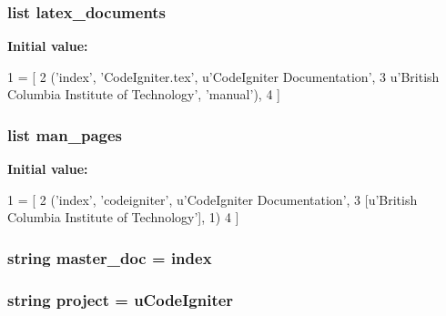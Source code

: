 \subsubsection[{latex\+\_\+documents}]{\setlength{\rightskip}{0pt plus 5cm}list latex\+\_\+documents}\label{namespaceconf_a19ce49f2838fb86624dc2d34e023baca}
{\bfseries Initial value\+:}
\begin{DoxyCode}
1 = [
2   (\textcolor{stringliteral}{'index'}, \textcolor{stringliteral}{'CodeIgniter.tex'}, \textcolor{stringliteral}{u'CodeIgniter Documentation'},
3    \textcolor{stringliteral}{u'British Columbia Institute of Technology'}, \textcolor{stringliteral}{'manual'}),
4 ]
\end{DoxyCode}
\hypertarget{namespaceconf_a09bebc3ead6c7c1acf6823c7a5609155}{}
\subsubsection[{man\+\_\+pages}]{\setlength{\rightskip}{0pt plus 5cm}list man\+\_\+pages}\label{namespaceconf_a09bebc3ead6c7c1acf6823c7a5609155}
{\bfseries Initial value\+:}
\begin{DoxyCode}
1 = [
2     (\textcolor{stringliteral}{'index'}, \textcolor{stringliteral}{'codeigniter'}, \textcolor{stringliteral}{u'CodeIgniter Documentation'},
3      [\textcolor{stringliteral}{u'British Columbia Institute of Technology'}], 1)
4 ]
\end{DoxyCode}
\hypertarget{namespaceconf_a87edce364655e617d4eea122c1c5db0a}{}
\subsubsection[{master\+\_\+doc}]{\setlength{\rightskip}{0pt plus 5cm}string master\+\_\+doc = \textquotesingle{}index\textquotesingle{}}\label{namespaceconf_a87edce364655e617d4eea122c1c5db0a}
\hypertarget{namespaceconf_a0af1c0d59538118611a1d7a6d8b45956}{}
\subsubsection[{project}]{\setlength{\rightskip}{0pt plus 5cm}string project = u\textquotesingle{}Code\+Igniter\textquotesingle{}}\label{namespaceconf_a0af1c0d59538118611a1d7a6d8b45956}
\hypertarget{namespaceconf_a55caf0e3a3760b53be9bc254d13dfbf2}{}
